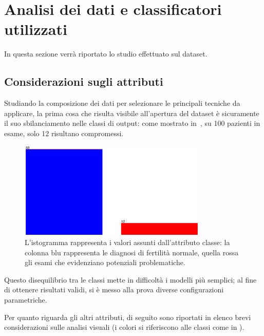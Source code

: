 \section{Analisi dei dati e classificatori utilizzati}

In questa sezione verrà riportato lo studio effettuato sul dataset.

\subsection{Considerazioni sugli attributi}

Studiando la composizione dei dati per selezionare le principali tecniche da applicare,
la prima cosa che risulta visibile all'apertura del dataset è sicuramente il suo sbilanciamento nelle classi di output:
come mostrato in~, su 100 pazienti in esame, solo 12 risultano compromessi.

\begin{figure}[H]
  \centering
  \includegraphics[width=0.8\textwidth]{fig/classes.eps}%
  \caption{%
    L'istogramma rappresenta i valori assunti dall'attributo classe:
    la colonna blu rappresenta le diagnosi di fertilità normale,
    quella rossa gli esami che evidenziano potenziali problematiche.
  }%
  \label{fig:classes}
\end{figure}

Questo disequilibrio tra le classi mette in difficoltà i modelli più semplici;
al fine di ottenere risultati validi, si è messo alla prova diverse configurazioni parametriche.

Per quanto riguarda gli altri attributi, di seguito sono riportati in elenco brevi considerazioni sulle analisi visuali (i colori si riferiscono alle classi come in ).


